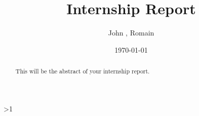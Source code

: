 \documentclass[a4paper]{article}  %
\title{Internship Report}
\author{John \famName{Doe}, Romain \famName{Noël}}
\date{\today}
\newcommand{\Pathbasebib}{\PathR/ref_RN.bib,\PathR/ref_XX.bib}%
\begin{document}

\maketitle

	\begin{abstract}
		This will be the abstract of your internship report.
	\end{abstract}







\ifnum\value{levelstanda}>1
	{}%
\else

	\printunsrtglossary[type=acronym]
	\printunsrtglossary[type=symbol]
\fi

\addtocounter{levelstanda}{-1}
\end{document}
